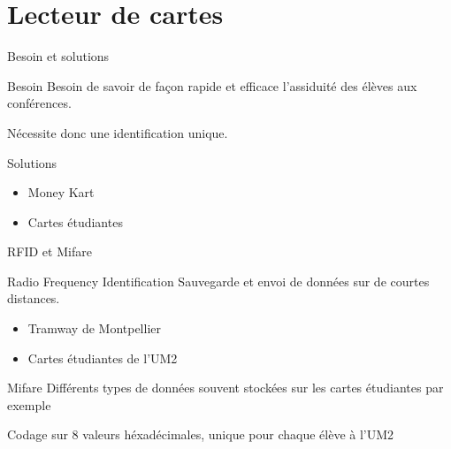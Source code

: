 \section{Lecteur de cartes}
\begin{frame}{Besoin et solutions}
	\begin{block}{Besoin}
        Besoin de savoir de façon rapide et efficace l'assiduité des élèves aux 
        conférences.

        Nécessite donc une identification unique.
	\end{block}

	\begin{block}{Solutions}
	    \begin{itemize}
            \item Money Kart
            \item Cartes étudiantes
	    \end{itemize}
	\end{block}
\end{frame}

\begin{frame}{RFID et Mifare}
	\begin{block}{Radio Frequency Identification}
        Sauvegarde et envoi de données sur de courtes distances.

	    \begin{itemize}
            \item Tramway de Montpellier
            \item Cartes étudiantes de l'UM2
	    \end{itemize}
	\end{block}

	\begin{block}{Mifare}
        Différents types de données souvent stockées sur les cartes étudiantes par
        exemple

        Codage sur 8 valeurs héxadécimales, unique pour chaque élève à l'UM2
	\end{block}
\end{frame}


